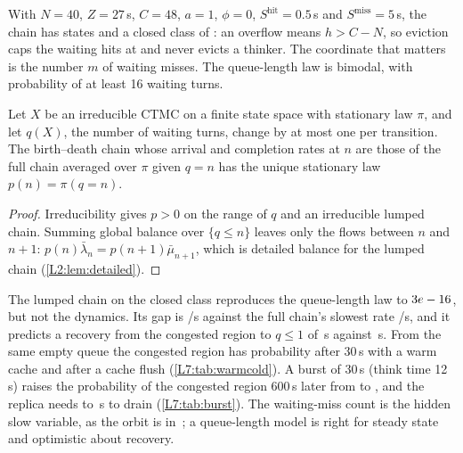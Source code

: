 With $N=40$, $Z=27$\,s, $C=48$, $a=1$, $\phi=0$, $S^{\mathrm{hit}}=0.5$\,s and
$S^{\mathrm{miss}}=5$\,s, the chain has \metaStates{} states and a closed class of
\metaRecurrent{}: an overflow means $h>C-N$, so eviction caps the waiting hits at
\metaRecurrentH{} and never evicts a thinker. The coordinate that matters is the number
$m$ of waiting misses. The queue-length law is bimodal, with probability \metaPBad{} of
at least 16 waiting turns.

\begin{lemma}\label{L7:lem:lump}
Let $X$ be an irreducible CTMC on a finite state space with stationary law $\pi$, and let
$q(X)$, the number of waiting turns, change by at most one per transition. The
birth--death chain whose arrival and completion rates at $n$ are those of the full chain
averaged over $\pi$ given $q=n$ has the unique stationary law $p(n)=\pi(q=n)$.
\end{lemma}
\begin{proof}
Irreducibility gives $p>0$ on the range of $q$ and an irreducible lumped chain. Summing
global balance over $\{q\le n\}$ leaves only the flows between $n$ and $n+1$:
$p(n)\bar\lambda_n=p(n+1)\bar\mu_{n+1}$, which is detailed balance for the lumped chain
(\cref{L2:lem:detailed}).
\end{proof}

The lumped chain on the closed class reproduces the queue-length law to
$3e-16$, but not the dynamics. Its gap is \metaGapOne{}/s against the full
chain's slowest rate \metaSlowThree{}/s, and it predicts a recovery from the congested
region to $q\le1$ of \metaRecOne\,s against \metaRecThree\,s. From the same empty queue
the congested region has probability \metaWarmThirty{} after 30\,s with a warm cache and
\metaColdThirty{} after a cache flush (\cref{L7:tab:warmcold}). A burst of 30\,s (think
time 12\,s) raises the probability of the congested region 600\,s later from
\metaBurstNone{} to \metaBurstThirty, and the replica needs \metaBurstRecLo{} to
\metaBurstRecHi\,s to drain (\cref{L7:tab:burst}). The waiting-miss count is the
hidden slow variable, as the orbit is in~\cite{alvaro2025}; a queue-length model is right
for steady state and optimistic about recovery.

\begin{table}[h]\centering\small
\metaWarmColdTable
\caption{Queue-and-cache chain: same empty queue, warm cache ($c=0$) or flushed cache
($c=N$). Exact transient laws.}\label{L7:tab:warmcold}
\end{table}

